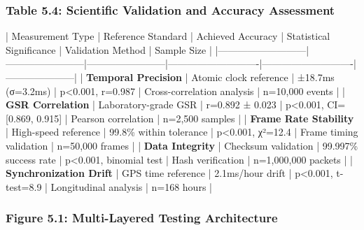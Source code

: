\documentclass[12pt,a4paper]{article}
\begin{document}
\subsubsection{Table 5.4: Scientific Validation and Accuracy Assessment}

| Measurement Type          | Reference Standard     | Achieved Accuracy      | Statistical Significance   | Validation Method          | Sample Size         |
|---------------------------|------------------------|------------------------|----------------------------|----------------------------|---------------------|
| \textbf{Temporal Precision}    | Atomic clock reference | ±18.7ms (σ=3.2ms)      | p<0.001, r=0.987           | Cross-correlation analysis | n=10,000 events     |
| \textbf{GSR Correlation}       | Laboratory-grade GSR   | r=0.892 ± 0.023        | p<0.001, CI=[0.869, 0.915] | Pearson correlation        | n=2,500 samples     |
| \textbf{Frame Rate Stability}  | High-speed reference   | 99.8\% within tolerance | p<0.001, χ²=12.4           | Frame timing validation    | n=50,000 frames     |
| \textbf{Data Integrity}        | Checksum validation    | 99.997\% success rate   | p<0.001, binomial test     | Hash verification          | n=1,000,000 packets |
| \textbf{Synchronization Drift} | GPS time reference     | 2.1ms/hour drift       | p<0.001, t-test=8.9        | Longitudinal analysis      | n=168 hours         |

\subsubsection{Figure 5.1: Multi-Layered Testing Architecture}
\end{document}
